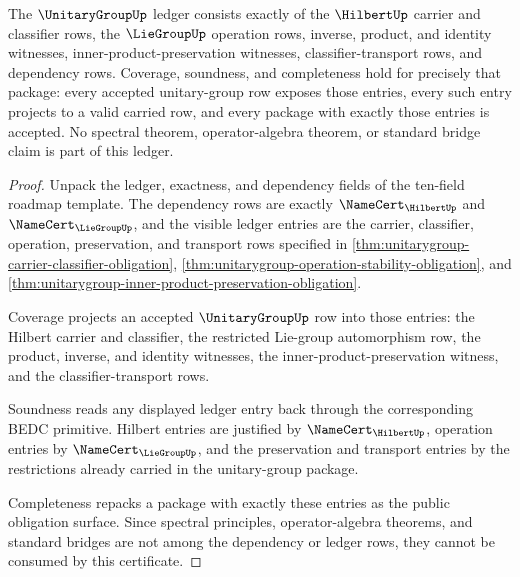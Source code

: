 \begin{theorem}\label{thm:unitarygroup-ledger-exactness-obligation}
The $\UnitaryGroupUp$ ledger consists exactly of the $\HilbertUp$ carrier and classifier rows, the $\LieGroupUp$ operation rows, inverse, product, and identity witnesses, inner-product-preservation witnesses, classifier-transport rows, and dependency rows. Coverage, soundness, and completeness hold for precisely that package: every accepted unitary-group row exposes those entries, every such entry projects to a valid carried row, and every package with exactly those entries is accepted. No spectral theorem, operator-algebra theorem, or standard bridge claim is part of this ledger.
\end{theorem}
\begin{proof}
Unpack the ledger, exactness, and dependency fields of the ten-field roadmap template. The dependency rows are exactly $\NameCert_{\HilbertUp}$ and $\NameCert_{\LieGroupUp}$, and the visible ledger entries are the carrier, classifier, operation, preservation, and transport rows specified in \autoref{thm:unitarygroup-carrier-classifier-obligation}, \autoref{thm:unitarygroup-operation-stability-obligation}, and \autoref{thm:unitarygroup-inner-product-preservation-obligation}.

Coverage projects an accepted $\UnitaryGroupUp$ row into those entries: the Hilbert carrier and classifier, the restricted Lie-group automorphism row, the product, inverse, and identity witnesses, the inner-product-preservation witness, and the classifier-transport rows.

Soundness reads any displayed ledger entry back through the corresponding BEDC primitive. Hilbert entries are justified by $\NameCert_{\HilbertUp}$, operation entries by $\NameCert_{\LieGroupUp}$, and the preservation and transport entries by the restrictions already carried in the unitary-group package.

Completeness repacks a package with exactly these entries as the public obligation surface. Since spectral principles, operator-algebra theorems, and standard bridges are not among the dependency or ledger rows, they cannot be consumed by this certificate.
\end{proof}

